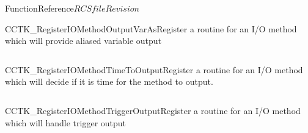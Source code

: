\begin{cactuspart}{FunctionReference}{$RCSfile$}{$Revision$}
\begin{CCTKFunc}{CCTK\_RegisterIOMethodOutputVarAs}{Register a routine for an I/O method which will provide aliased variable output}
\label{CCTK-RegisterIOMethodOutputVarAs}
\showcargs
\begin{params}
\end{params}
\begin{discussion}
\end{discussion}
\begin{examples}
\begin{tabular}{@{}p{3cm}cp{11cm}}
\end{tabular}
\end{examples}
\begin{errorcodes}
\end{errorcodes}
\end{CCTKFunc}


\begin{CCTKFunc}{CCTK\_RegisterIOMethodTimeToOutput}{Register a routine for an I/O method which will decide if it is time for the method to output.}
\label{CCTK-RegisterIOMethodTimeToOutput}
\showcargs
\begin{params}
\end{params}
\begin{discussion}
\end{discussion}
\begin{examples}
\begin{tabular}{@{}p{3cm}cp{11cm}}
\end{tabular}
\end{examples}
\begin{errorcodes}
\end{errorcodes}
\end{CCTKFunc}

\begin{CCTKFunc}{CCTK\_RegisterIOMethodTriggerOutput}{Register a routine for an I/O method which will handle trigger output}
\label{CCTK-RegisterIOMethodTriggerOutput}
\showcargs
\begin{params}
\end{params}
\begin{discussion}
\end{discussion}
\begin{examples}
\begin{tabular}{@{}p{3cm}cp{11cm}}
\end{tabular}
\end{examples}
\begin{errorcodes}
\end{errorcodes}
\end{CCTKFunc}


\end{cactuspart}
